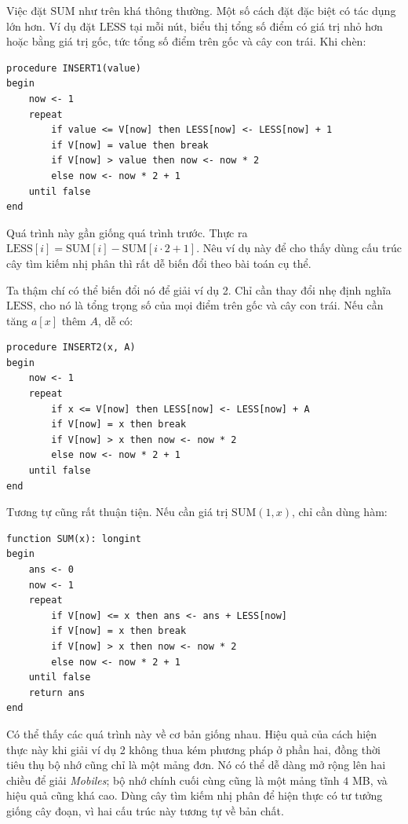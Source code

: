 \documentclass[11pt]{article}
\begin{document}
Việc đặt \(\mathrm{SUM}\) như trên khá thông thường. Một số cách đặt đặc biệt
có tác dụng lớn hơn. Ví dụ đặt \(\mathrm{LESS}\) tại mỗi nút, biểu thị tổng số
điểm có giá trị nhỏ hơn hoặc bằng giá trị gốc, tức tổng số điểm trên gốc và
cây con trái. Khi chèn:

\begin{verbatim}
procedure INSERT1(value)
begin
    now <- 1
    repeat
        if value <= V[now] then LESS[now] <- LESS[now] + 1
        if V[now] = value then break
        if V[now] > value then now <- now * 2
        else now <- now * 2 + 1
    until false
end
\end{verbatim}

Quá trình này gần giống quá trình trước. Thực ra
\(\mathrm{LESS}[i]=\mathrm{SUM}[i]-\mathrm{SUM}[i\cdot 2+1]\). Nêu ví dụ này
để cho thấy dùng cấu trúc cây tìm kiếm nhị phân thì rất dễ biến đổi theo bài
toán cụ thể.

Ta thậm chí có thể biến đổi nó để giải ví dụ 2. Chỉ cần thay đổi nhẹ định
nghĩa \(\mathrm{LESS}\), cho nó là tổng trọng số của mọi điểm trên gốc và cây
con trái. Nếu cần tăng \(a[x]\) thêm \(A\), dễ có:

\begin{verbatim}
procedure INSERT2(x, A)
begin
    now <- 1
    repeat
        if x <= V[now] then LESS[now] <- LESS[now] + A
        if V[now] = x then break
        if V[now] > x then now <- now * 2
        else now <- now * 2 + 1
    until false
end
\end{verbatim}

Tương tự cũng rất thuận tiện. Nếu cần giá trị \(\mathrm{SUM}(1,x)\), chỉ cần
dùng hàm:

\begin{verbatim}
function SUM(x): longint
begin
    ans <- 0
    now <- 1
    repeat
        if V[now] <= x then ans <- ans + LESS[now]
        if V[now] = x then break
        if V[now] > x then now <- now * 2
        else now <- now * 2 + 1
    until false
    return ans
end
\end{verbatim}

Có thể thấy các quá trình này về cơ bản giống nhau. Hiệu quả của cách hiện
thực này khi giải ví dụ 2 không thua kém phương pháp ở phần hai, đồng thời
tiêu thụ bộ nhớ cũng chỉ là một mảng đơn. Nó có thể dễ dàng mở rộng lên hai
chiều để giải \textit{Mobiles}; bộ nhớ chính cuối cùng cũng là một mảng tĩnh
\(4\) MB, và hiệu quả cũng khá cao. Dùng cây tìm kiếm nhị phân để hiện thực
có tư tưởng giống cây đoạn, vì hai cấu trúc này tương tự về bản chất.
\end{document}
